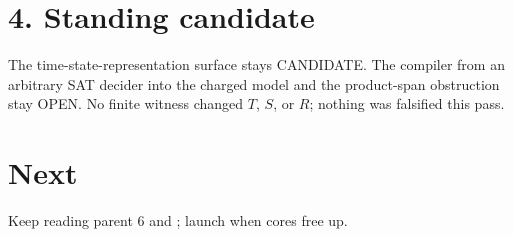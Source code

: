 \documentclass[11pt]{article}
\begin{document}
\section*{4. Standing candidate}
The time-state-representation surface stays CANDIDATE. The compiler from an arbitrary SAT decider into the charged model and the product-span obstruction stay OPEN. No finite witness changed $T$, $S$, or $R$; nothing was falsified this pass.

\section*{Next}
Keep reading parent 6 and ; launch  when cores free up.
\end{document}
